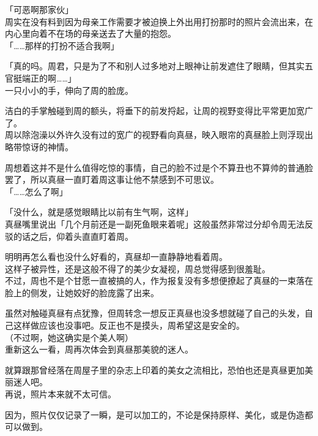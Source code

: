 「可恶啊那家伙」\\

周实在没有料到因为母亲工作需要才被迫换上外出用打扮那时的照片会流出来，在内心里向着不在场的母亲送去了大量的抱怨。\\

「……那样的打扮不适合我啊」

「真的吗。周君，只是为了不和别人过多地对上眼神让前发遮住了眼睛，但其实五官挺端正的啊……」\\

一只小小的手，伸向了周的脸庞。

洁白的手掌触碰到周的额头，将垂下的前发捋起，让周的视野变得比平常更加宽广了。\\

周以除泡澡以外许久没有过的宽广的视野看向真昼，映入眼帘的真昼脸上则浮现出略带惊讶的神情。

周想着这并不是什么值得吃惊的事情，自己的脸不过是个不算丑也不算帅的普通脸罢了，所以真昼一直盯着周这事让他不禁感到不可思议。\\

「……怎么了啊」

「没什么，就是感觉眼睛比以前有生气啊，这样」\\

真昼嘴里说出「几个月前还是一副死鱼眼来着呢」这般虽然非常过分却令周无法反驳的话之后，仰着头直直盯着周。

明明再怎么看也没什么好看的，真昼却一直静静地看着周。\\

这样子被异性，还是这般不得了的美少女凝视，周总觉得感到很羞耻。\\

不过，周也不是个甘愿一直被搞的人，作为报复没有多想便撩起了真昼的一束落在脸上的侧发，让她姣好的脸庞露了出来。

虽然对触碰真昼有点犹豫，但周转念一想反正真昼也没多想就碰了自己的头发，自己这样做应该也没事吧。反正也不是摸头，周希望这是安全的。\\

（不过啊，她这确实是个美人啊）\\

重新这么一看，周再次体会到真昼那美貌的迷人。

就算跟那曾经落在周屋子里的杂志上印着的美女之流相比，恐怕也还是真昼更加美丽迷人吧。\\

再说，照片本来就不太可信。

因为，照片仅仅记录了一瞬，是可以加工的，不论是保持原样、美化，或是伪造都可以做到。\\

